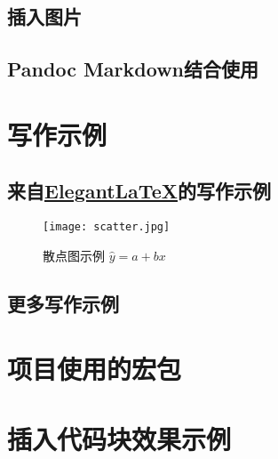\documentclass[12pt, green, textbook]{uglyrep}
\begin{document}
\section{插入图片}


\section{Pandoc Markdown结合使用}



\chapter{写作示例}

\section{来自\href{https://github.com/ElegantLaTeX/}{Elegant\LaTeX}的写作示例}


\begin{figure}[htbp]
  \centering
  \texttt{[image: scatter.jpg]}
  \caption{散点图示例 $\hat{y}=a+bx$ \label{fig:scatter}}
\end{figure}

\section{更多写作示例}


\printbibliography[
  title=\ebibname
]

\clearpage
\appendix
\appendixpage
\addappheadtotoc

\chapter{项目使用的宏包}


\chapter{插入代码块效果示例}

\end{document}
